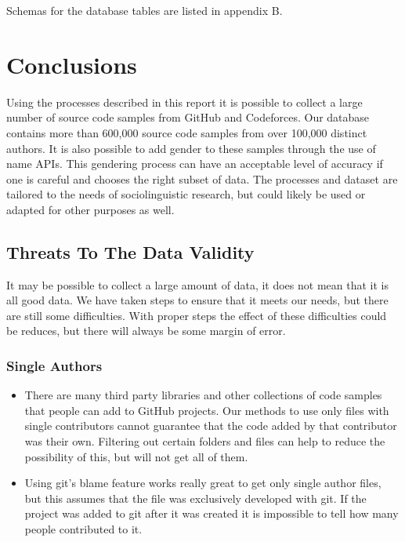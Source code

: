 \documentclass[12pt]{article}
\begin{document}
Schemas for the database tables are listed in appendix B.


\section{Conclusions}
Using the processes described in this report it is possible to collect a large number of source code samples from GitHub and Codeforces. Our database contains more than 600,000 source code samples from over 100,000 distinct authors. It is also possible to add gender to these samples through the use of name APIs. This gendering process can have an acceptable level of accuracy if one is careful and chooses the right subset of data. The processes and dataset are tailored to the needs of sociolinguistic research, but could likely be used or adapted for other purposes as well.

\subsection{Threats To The Data Validity}
It may be possible to collect a large amount of data, it does not mean that it is all good data. We have taken steps to ensure that it meets our needs, but there are still some difficulties. With proper steps the effect of these difficulties could be reduces, but there will always be some margin of error.

\subsubsection*{Single Authors}
\begin{itemize}
    \item There are many third party libraries and other collections of code samples that people can add to GitHub projects. Our methods to use only files with single contributors cannot guarantee that the code added by that contributor was their own. Filtering out certain folders and files can help to reduce the possibility of this, but will not get all of them.
    \item Using git's blame feature works really great to get only single author files, but this assumes that the file was exclusively developed with git. If the project was added to git after it was created it is impossible to tell how many people contributed to it.
\end{itemize}
\end{document}
